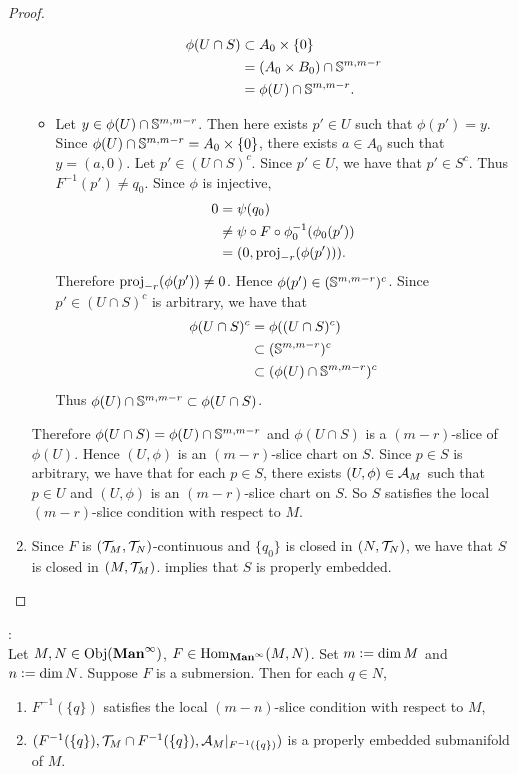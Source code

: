\documentclass{book}
\begin{document}
\begin{proof}
\begin{enumerate}
\begin{itemize}
				\begin{align*}
					\phi(U \cap S) 
					& \subset A_0 \times \{0\} \\
					& = (A_0 \times B_0) \cap \S^{m, m-r} \\
					& = \phi(U) \cap \S^{m, m-r}.
				\end{align*}
				\item Let $y \in \phi(U) \cap \S^{m, m-r}$. Then here exists $p' \in U$ such that $\phi(p') = y$. Since  $\phi(U) \cap \S^{m, m-r} = A_0 \times \{0\}$, there exists $a \in A_0$ such that $y = (a, 0)$. Let $p' \in (U \cap S)^c$. Since $p' \in U$, we have that $p' \in S^c$. Thus $F^{-1}(p') \neq q_0$. Since $\phi$ is injective, 
				\begin{align*}
					0
					& = \psi(q_0) \\
					& \neq \psi \circ F \circ \phi_0^{-1}(\phi_0(p')) \\
					& = (0, \prj_{-r}(\phi(p'))).
				\end{align*}
				Therefore $\prj_{-r}(\phi(p')) \neq 0$. Hence $\phi(p') \in (\S^{m, m-r})^c$. Since $p' \in (U \cap S)^c$ is arbitrary, we have that 
				\begin{align*}
					\phi(U \cap S)^c
					& = \phi((U \cap S)^c) \\
					& \subset (\S^{m, m-r})^c \\
					& \subset (\phi(U) \cap \S^{m, m-r})^c
				\end{align*}
				Thus $\phi(U) \cap \S^{m, m-r} \subset \phi(U \cap S)$. 
			\end{itemize}
			Therefore $\phi(U \cap S) = \phi(U) \cap \S^{m, m-r}$ and $\phi(U \cap S)$ is a $(m-r)$-slice of $\phi(U)$. Hence $(U, \phi)$ is an $(m-r)$-slice chart on $S$. Since $p \in S$ is arbitrary, we have that for each $p \in S$, there exists $(U, \phi) \in \MA_M$ such that $p \in U$ and $(U, \phi)$ is an $(m-r)$-slice chart on $S$. So $S$ satisfies the local $(m-r)$-slice condition with respect to $M$.  
			\item Since $F$ is $(\MT_M, \MT_N)$-continuous and $\{q_0\}$ is closed in $(N, \MT_N)$, we have that $S$ is closed in $(M, \MT_M)$. \rex{}  implies that $S$ is properly embedded.
		\end{enumerate}
	\end{proof}
	
	\begin{ex}  : \\
		Let $M, N \in \Obj(\Maninf)$, $F \in \Hom_{\Maninf}(M,N)$. Set $m \defeq \dim M$ and $n \defeq \dim N$. Suppose $F$ is a submersion. Then for each $q \in N$, 
		\begin{enumerate}
			\item $F^{-1}(\{q\})$ satisfies the local $(m-n)$-slice condition with respect to $M$,
			\item $(F^{-1}(\{q\}), \MT_M \cap F^{-1}(\{q\}), \MA_M|_{F^{-1}(\{q\})})$ is a properly embedded submanifold of $M$.
		\end{enumerate}
	\end{ex}
\end{document}
